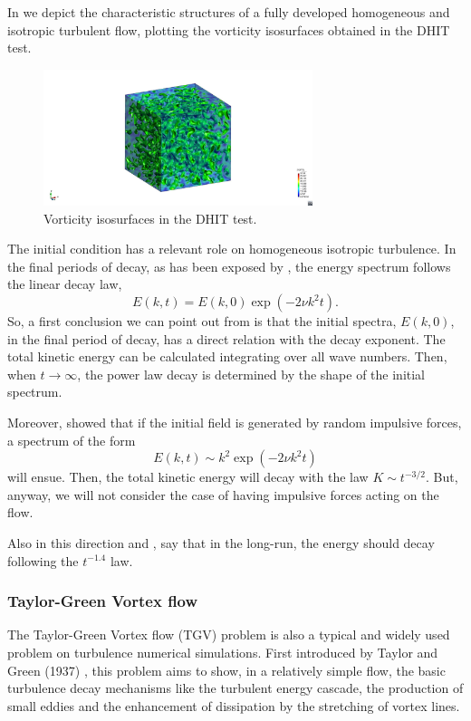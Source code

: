 In  we depict the characteristic structures of a fully developed homogeneous and isotropic turbulent flow, plotting the vorticity isosurfaces obtained in the DHIT test.
\begin{figure}[h!]
	\centering	
	\includegraphics[trim=18cm 3.3cm 14cm 3.2cm,clip=true,width=0.7\textwidth]{Figures/Chapter3/DHIT_isovorticity}
	\caption{Vorticity isosurfaces in the DHIT test.}
	\label{fig-DHIT_isovorticity}
\end{figure}

The initial condition has a relevant role on homogeneous isotropic turbulence. In the final periods of decay, as has been exposed by \cite{hinze_turbulence_1975}, the energy spectrum follows the linear decay law,
\begin{equation}
\label{eq-DHIT_final_decay}
E(k,t)=E(k,0)\exp(-2\nu k^2t).
\end{equation}
So, a first conclusion we can point out from  is that the initial spectra, $E(k,0)$, in the final period of decay, has a direct relation with the decay exponent. The total kinetic energy can be calculated integrating  over all wave numbers. Then, when $t\rightarrow\infty$, the power law decay is determined by the shape of the initial spectrum.

Moreover, \cite{saffman_large-scale_1967} showed that if the initial field is generated by random impulsive forces, a spectrum of the form
\begin{equation}
\label{eq-DHIT_staffman_decay}
E(k,t)\sim k^2\exp(-2\nu k^2t)
\end{equation}
will ensue. Then, the total kinetic energy will decay with the law $K\sim t^{-3/2}$. But, anyway, we will not consider the case of having impulsive forces acting on the flow.

Also in this direction \cite{rohe_analysis_2010} and \cite{chalot1998consistent}, say that in the long-run, the energy should decay following the $t^{-1.4}$ law.

\subsubsection{Taylor-Green Vortex flow}
\label{subsubsec-C3_TGV}
The Taylor-Green Vortex flow (TGV) problem is also a typical and widely used problem on turbulence numerical simulations. First introduced by Taylor and Green (1937) \cite{taylor_mechanism_1937}, this problem aims to show, in a relatively simple flow, the basic turbulence decay mechanisms like the turbulent energy cascade, the production of small eddies and the enhancement of dissipation by the stretching of vortex lines.

